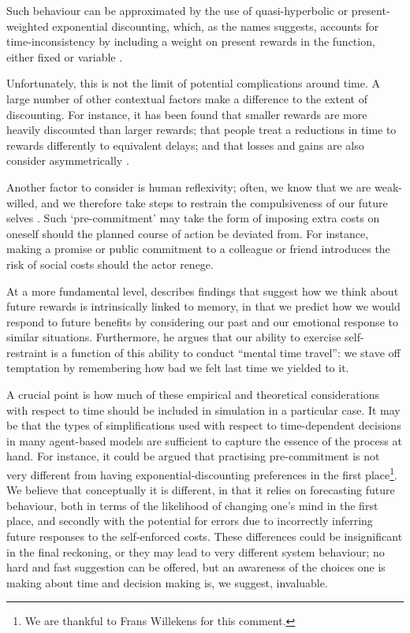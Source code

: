 \documentclass{article}
\begin{document}
Such behaviour can be approximated by the use of quasi-hyperbolic or
present-weighted exponential discounting, which, as the names suggests,
accounts for time-inconsistency by including a weight on present rewards
in the function, either fixed or variable \citep{Benhabib2010}.

Unfortunately, this is not the limit of potential complications around
time. A large number of other contextual factors make a difference to the extent of discounting. For instance, it has been found that smaller rewards are more heavily discounted than larger rewards; that people treat a reductions in time to rewards
differently to equivalent delays; and that losses and gains are also consider asymmetrically \citep{Read2000}.

Another factor to consider is human reflexivity; often, we know that we
are weak-willed, and we therefore take steps to restrain the
compulsiveness of our future selves \citep{ODonoghue2000}. Such
`pre-commitment' may take the form of imposing extra costs on oneself
should the planned course of action be deviated from. For instance,
making a promise or public commitment to a colleague or friend
introduces the risk of social costs should the actor renege.

At a more fundamental level, \citet{Boyer2008} describes findings that
suggest how we think about future rewards is intrinsically linked to
memory, in that we predict how we would respond to future benefits by
considering our past and our emotional response to similar situations.
Furthermore, he argues that our ability to exercise self-restraint is a
function of this ability to conduct ``mental time travel'': we stave off
temptation by remembering how bad we felt last time we yielded to it.

A crucial point is how much of these empirical and theoretical
considerations with respect to time should be included in simulation in
a particular case. It may be that the types of simplifications used with
respect to time-dependent decisions in many agent-based models are
sufficient to capture the essence of the process at hand. For instance,
it could be argued that practising pre-commitment is not very different
from having exponential-discounting preferences in the first place\footnote{We are thankful to Frans Willekens for this comment.}. We believe that conceptually it is
different, in that it relies on forecasting future behaviour, both in
terms of the likelihood of changing one's mind in the first place, and
secondly with the potential for errors due to incorrectly inferring
future responses to the self-enforced costs. These differences could be
insignificant in the final reckoning, or they may lead to very different
system behaviour; no hard and fast suggestion can be offered, but an
awareness of the choices one is making about time and decision making
is, we suggest, invaluable.
\end{document}
